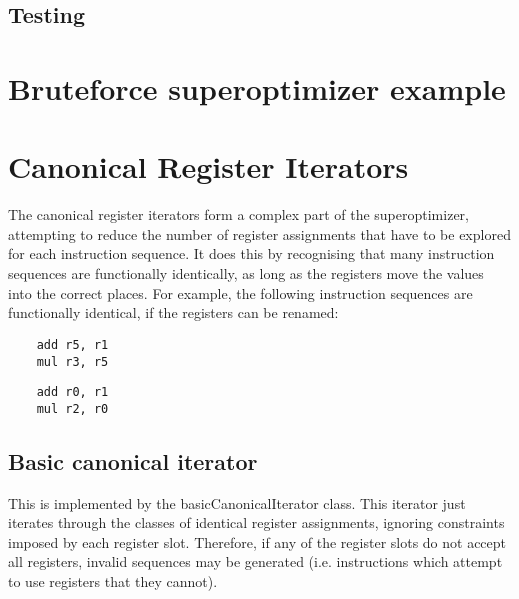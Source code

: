 \documentclass{article}
\begin{document}

\subsection{Testing}

\section{Bruteforce superoptimizer example}


\section{Canonical Register Iterators}
The canonical register iterators form a complex part of the superoptimizer, attempting to reduce the number of register assignments that have to be explored for each instruction sequence. It does this by recognising that many instruction sequences are functionally identically, as long as the registers move the values into the correct places. For example, the following instruction sequences are functionally identical, if the registers can be renamed:

\begin{minipage}{0.3\textwidth}
\begin{verbatim}
    add r5, r1
    mul r3, r5
\end{verbatim}
\end{minipage}
\hspace{1cm}
\begin{minipage}{0.3\textwidth}
\begin{verbatim}
    add r0, r1
    mul r2, r0
\end{verbatim}
\end{minipage}

\subsection{Basic canonical iterator}
This is implemented by the basicCanonicalIterator class. This iterator just iterates through the classes of identical register assignments, ignoring constraints imposed by each register slot. Therefore, if any of the register slots do not accept all registers, invalid sequences may be generated (i.e. instructions which attempt to use registers that they cannot).
\end{document}
